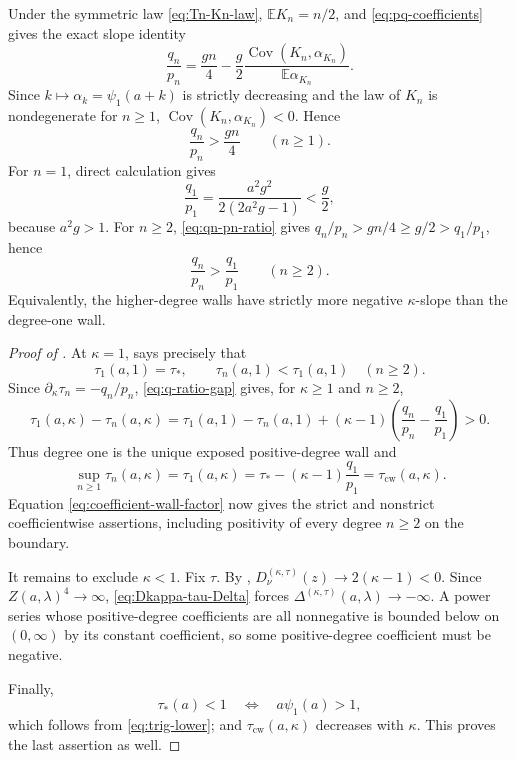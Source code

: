 \documentclass[11pt,a4paper]{amsart}
\numberwithin{equation}{section}
\theoremstyle{plain}
\theoremstyle{definition}
\newcommand{\E}{\mathbb E}
\begin{document}
Under the symmetric law \eqref{eq:Tn-Kn-law}, \(\E K_n=n/2\), and
\eqref{eq:pq-coefficients} gives the exact slope identity
\begin{equation}\label{eq:wall-slope-covariance}
 \frac{q_n}{p_n}
 =\frac{gn}{4}
 -\frac g2\frac{\operatorname{Cov}(K_n,\alpha_{K_n})}
 {\E\alpha_{K_n}}.
\end{equation}
Since \(k\mapsto\alpha_k=\psi_1(a+k)\) is strictly decreasing and the law of
\(K_n\) is nondegenerate for \(n\ge1\),
\(\operatorname{Cov}(K_n,\alpha_{K_n})<0\).  Hence
\begin{equation}\label{eq:qn-pn-ratio}
 \frac{q_n}{p_n}>\frac{gn}{4}\qquad(n\ge1).
\end{equation}
For \(n=1\), direct calculation gives
\begin{equation}\label{eq:q1-p1}
 \frac{q_1}{p_1}
 =\frac{a^2g^2}{2(2a^2g-1)}<\frac g2,
\end{equation}
because \(a^2g>1\).  For \(n\ge2\), \eqref{eq:qn-pn-ratio} gives
\(q_n/p_n>gn/4\ge g/2>q_1/p_1\), hence
\begin{equation}\label{eq:q-ratio-gap}
 \frac{q_n}{p_n}>\frac{q_1}{p_1}\qquad(n\ge2).
\end{equation}
Equivalently, the higher-degree walls have strictly more negative
\(\kappa\)-slope than the degree-one wall.

\begin{proof}[Proof of ]
At \(\kappa=1\),  says precisely that
\[
 \tau_1(a,1)=\tau_*,
 \qquad
 \tau_n(a,1)<\tau_1(a,1)\quad(n\ge2).
\]
Since \(\partial_\kappa\tau_n=-q_n/p_n\), \eqref{eq:q-ratio-gap} gives, for
\(\kappa\ge1\) and \(n\ge2\),
\[
 \tau_1(a,\kappa)-\tau_n(a,\kappa)
 =\tau_1(a,1)-\tau_n(a,1)
 +(\kappa-1)\left(\frac{q_n}{p_n}-\frac{q_1}{p_1}\right)>0.
\]
Thus degree one is the unique exposed positive-degree wall and
\[
 \sup_{n\ge1}\tau_n(a,\kappa)
 =\tau_1(a,\kappa)
 =\tau_*-(\kappa-1)\frac{q_1}{p_1}
 =\tau_{\mathrm{cw}}(a,\kappa).
\]
Equation \eqref{eq:coefficient-wall-factor} now gives the strict and nonstrict
coefficientwise assertions, including positivity of every degree \(n\ge2\) on
the boundary.

It remains to exclude \(\kappa<1\).  Fix \(\tau\).  By
,
\(D_\nu^{(\kappa,\tau)}(z)\to2(\kappa-1)<0\).  Since
\(Z(a,\lambda)^4\to\infty\), \eqref{eq:Dkappa-tau-Delta} forces
\(\Delta^{(\kappa,\tau)}(a,\lambda)\to-\infty\).  A power series whose
positive-degree coefficients are all nonnegative is bounded below on
\((0,\infty)\) by its constant coefficient, so some positive-degree
coefficient must be negative.

Finally,
\[
 \tau_*(a)<1
 \quad\Longleftrightarrow\quad
 a\psi_1(a)>1,
\]
which follows from \eqref{eq:trig-lower}; and
\(\tau_{\mathrm{cw}}(a,\kappa)\) decreases with \(\kappa\).  This proves the
last assertion as well.
\end{proof}
\end{document}
